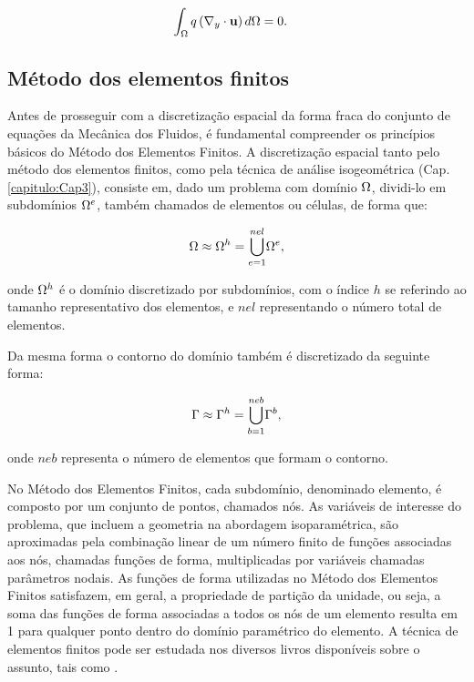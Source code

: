 \documentclass[tese_patricia]{subfiles}%
\begin{document}
\begin{align}
\int_{\Omega} q \left(\nabla_y \cdot \mathbf{u}\right) d \Omega &= 0. \label{eq:CWeakForm1} 
\end{align}


\subsection{Método dos elementos finitos }

Antes de prosseguir com a discretização espacial da forma fraca do conjunto de equações da Mecânica dos Fluidos, é fundamental compreender os princípios básicos do Método dos Elementos Finitos.  A discretização espacial tanto pelo método dos elementos finitos, como pela técnica de análise isogeométrica (Cap. \ref{capitulo:Cap3}), consiste em, dado um problema com domínio $\Omega$, dividi-lo em subdomínios $\Omega^{e}$, também chamados de elementos ou células, de forma que:

\begin{align}
	\Omega \approx \Omega^{h} = {\bigcup_{e = 1}^{nel}} \Omega^{e},
\end{align}

\noindent onde $\Omega^{h}$ é o domínio discretizado por subdomínios, com o índice $h$ se referindo ao tamanho representativo dos elementos, e $nel$ representando o número total de elementos.

Da mesma forma o contorno do domínio também é discretizado da seguinte forma:

\begin{align}
	\Gamma \approx \Gamma^{h} = {\bigcup_{b = 1}^{neb}} \Gamma^{b},
\end{align}

\noindent onde $neb$ representa o número de elementos que formam o contorno.

No Método dos Elementos Finitos, cada subdomínio, denominado elemento, é composto por um conjunto de pontos, chamados nós. As variáveis de interesse do problema, que incluem a geometria na abordagem isoparamétrica, são aproximadas pela combinação linear de um número finito de funções associadas aos nós, chamadas funções de forma, multiplicadas por variáveis chamadas parâmetros nodais. As funções de forma utilizadas no Método dos Elementos Finitos satisfazem, em geral, a propriedade de partição da unidade, ou seja, a soma das funções de forma associadas a todos os nós de um elemento resulta em 1 para qualquer ponto dentro do domínio paramétrico do elemento. A técnica de elementos finitos pode ser estudada nos diversos livros disponíveis sobre o assunto, tais como .
\end{document}
